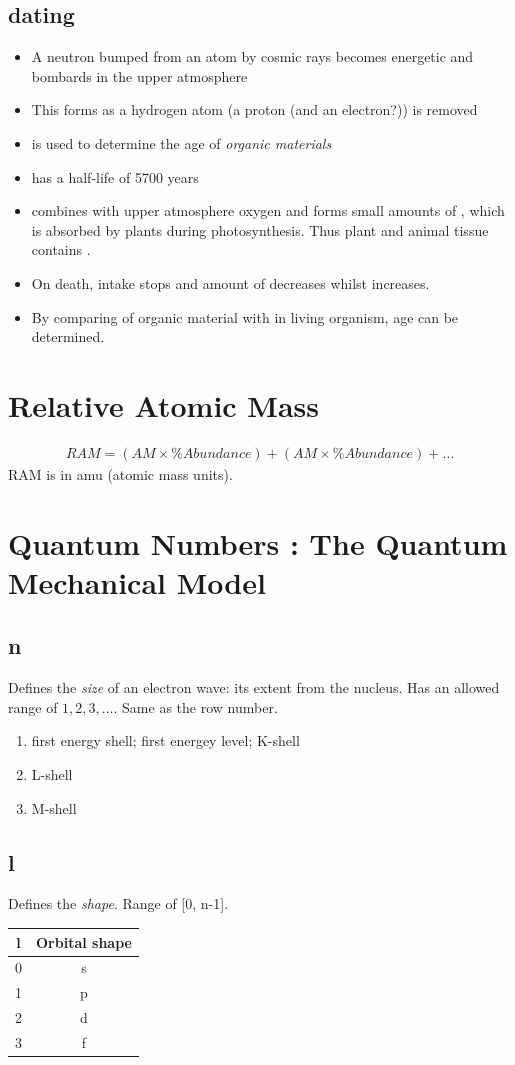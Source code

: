 \documentclass[a4paper, 8pt]{memoir}
\begin{document}
\section{ dating}
\begin{itemize}
\item A neutron bumped from an atom by cosmic rays becomes energetic and bombards  in the upper atmosphere
\item This forms  as a hydrogen atom (a proton (and an electron?)) is removed
\item {} is used to determine the age of \emph{organic materials}
\item {} has a half-life of 5700 years
\item {} combines with upper atmosphere oxygen and forms small amounts of , which is absorbed by plants during photosynthesis. Thus plant and animal tissue contains .
\item On death,  intake stops and amount of  decreases whilst  increases.
\item By comparing  of organic material with  in living organism, age can be determined.
\end{itemize}
\chapter{Relative Atomic Mass}
\begin{align}
RAM = (AM\times{}\%Abundance)+(AM\times{}\%Abundance)+\dotsc
\end{align}
RAM is in amu (atomic mass units).
\chapter{Quantum Numbers : The Quantum Mechanical Model}
\section{n}
Defines the \emph{size} of an electron wave: its extent from the nucleus. Has an allowed range of $1,2,3,\dotsc$. Same as the row number.
\begin{enumerate}
\item first energy shell; first energey level; K-shell
\item L-shell
\item M-shell
\end{enumerate}
\section{l}
Defines the \emph{shape}. Range of [0, n-1].
\begin{tabular}{|c|c|}
\hline
l & Orbital shape \\ \hline
0 & s \\ \hline
1 & p \\ \hline
2 & d \\ \hline
3 & f \\ \hline
\end{tabular}
\end{document}
